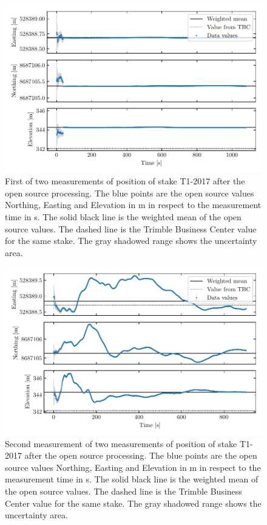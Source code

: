 \begin{figure}[H]
    \centering
    \includegraphics[width=\textwidth]{./figs/timeseries/46250700_corr-T1-i-2017_Timeseries-east-north-elev.pdf}
    \caption{First of two measurements of position of stake T1-2017 after the open source processing. The blue points are the open source values Northing, Easting and Elevation in m in respect to the measurement time in s. The solid black line is the weighted mean of the open source values. The dashed line is the Trimble Business Center value for the same stake. The gray shadowed range shows the uncertainty area.}
    \label{GPS:fig:T1-i_timeseries}
\end{figure}

\begin{figure}[H]
    \centering
    \includegraphics[width=\textwidth]{./figs/timeseries/46250723_corr-T1-ii-2017_Timeseries-east-north-elev.pdf}
    \caption{Second measurement  of two measurements of position of stake T1-2017  after the open source processing. The blue points are the open source values Northing, Easting and Elevation in m in respect to the measurement time in s. The solid black line is the weighted mean of the open source values. The dashed line is the Trimble Business Center value for the same stake. The gray shadowed range shows the uncertainty area.}
    \label{GPS:fig:T1-ii_timeseries}
\end{figure}

